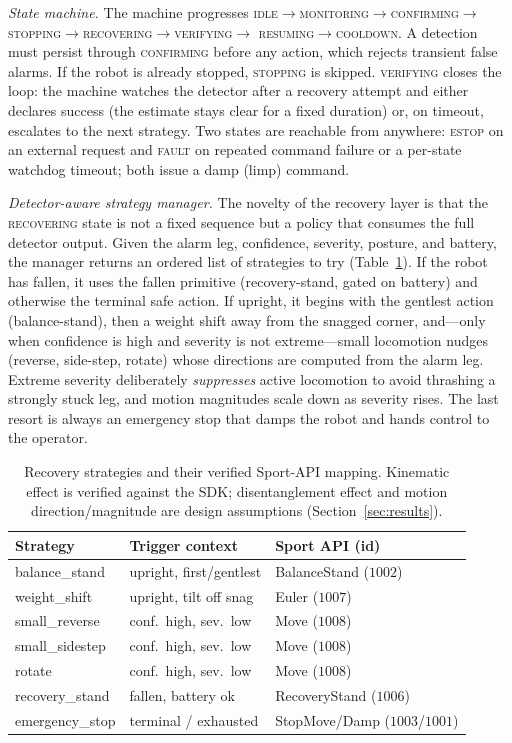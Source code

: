 \documentclass[conference]{IEEEtran}
\newcommand{\stt}[1]{\textsc{#1}}
\begin{document}
\emph{State machine.} The machine progresses
\stt{idle}$\rightarrow$\stt{monitoring}$\rightarrow$\stt{confirming}$\rightarrow$
\stt{stopping}$\rightarrow$\stt{recovering}$\rightarrow$\stt{verifying}$\rightarrow$
\stt{resuming}$\rightarrow$\stt{cooldown}. A detection must persist through
\stt{confirming} before any action, which rejects transient false alarms. If the
robot is already stopped, \stt{stopping} is skipped. \stt{verifying} closes the loop:
the machine watches the detector after a recovery attempt and either declares success
(the estimate stays clear for a fixed duration) or, on timeout, escalates to the next
strategy. Two states are reachable from anywhere: \stt{estop} on an external request
and \stt{fault} on repeated command failure or a per-state watchdog timeout; both
issue a damp (limp) command.

\emph{Detector-aware strategy manager.} The novelty of the recovery layer is that the
\stt{recovering} state is not a fixed sequence but a policy that consumes the full
detector output. Given the alarm leg, confidence, severity, posture, and battery, the
manager returns an ordered list of strategies to try (Table~\ref{tab:strategies}). If
the robot has fallen, it uses the fallen primitive (recovery-stand, gated on battery)
and otherwise the terminal safe action. If upright, it begins with the gentlest action
(balance-stand), then a weight shift away from the snagged corner, and---only when
confidence is high and severity is not extreme---small locomotion nudges (reverse,
side-step, rotate) whose directions are computed from the alarm leg. Extreme severity
deliberately \emph{suppresses} active locomotion to avoid thrashing a strongly stuck
leg, and motion magnitudes scale down as severity rises. The last resort is always an
emergency stop that damps the robot and hands control to the operator.

\begin{table}[t]
\centering
\caption{Recovery strategies and their verified Sport-API mapping. Kinematic effect
is verified against the SDK; disentanglement effect and motion direction/magnitude
are design assumptions (Section~\ref{sec:results}).}
\label{tab:strategies}
\footnotesize
\begin{tabular}{@{}lll@{}}
\toprule
Strategy & Trigger context & Sport API (id) \\
\midrule
balance\_stand   & upright, first/gentlest      & BalanceStand ($1002$) \\
weight\_shift    & upright, tilt off snag       & Euler ($1007$) \\
small\_reverse   & conf.\ high, sev.\ low        & Move ($1008$) \\
small\_sidestep  & conf.\ high, sev.\ low        & Move ($1008$) \\
rotate           & conf.\ high, sev.\ low        & Move ($1008$) \\
recovery\_stand  & fallen, battery ok           & RecoveryStand ($1006$) \\
emergency\_stop  & terminal / exhausted         & StopMove/Damp ($1003$/$1001$) \\
\bottomrule
\end{tabular}
\end{table}
\end{document}
